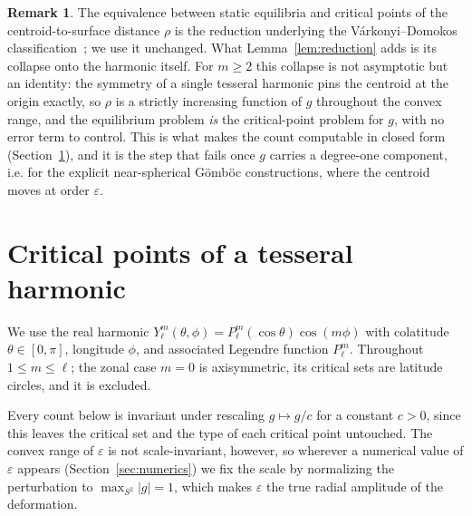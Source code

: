 \documentclass[11pt,a4paper]{article}
\theoremstyle{definition}
\newtheorem{remark}{Remark}
\begin{document}
\begin{remark}
The equivalence between static equilibria and critical points of the centroid-to-surface distance $\rho$ is
the reduction underlying the V\'arkonyi--Domokos classification~\cite{varkonyi2006b}; we use it unchanged. What
Lemma~\ref{lem:reduction} adds is its collapse onto the harmonic itself. For $m\ge2$ this collapse is not
asymptotic but an identity: the symmetry of a single tesseral harmonic pins the centroid at the origin
exactly, so $\rho$ is a strictly increasing function of $g$ throughout the convex range, and the equilibrium
problem \emph{is} the critical-point problem for $g$, with no error term to control. This is what makes the
count computable in closed form (Section~\ref{sec:count}), and it is the step that fails once $g$ carries a
degree-one component, i.e. for the explicit near-spherical G\"omb\"oc constructions, where the centroid moves
at order $\varepsilon$.
\end{remark}

\section{Critical points of a tesseral harmonic}\label{sec:count}

We use the real harmonic $Y_\ell^m(\theta,\phi)=P_\ell^m(\cos\theta)\cos(m\phi)$ with colatitude
$\theta\in[0,\pi]$, longitude $\phi$, and associated Legendre function $P_\ell^m$. Throughout $1\le m\le\ell$;
the zonal case $m=0$ is axisymmetric, its critical sets are latitude circles, and it is excluded.

Every count below is invariant under rescaling $g\mapsto g/c$ for a constant $c>0$, since this leaves the
critical set and the type of each critical point untouched. The convex range of $\varepsilon$ is not
scale-invariant, however, so wherever a numerical value of $\varepsilon$ appears (Section~\ref{sec:numerics})
we fix the scale by normalizing the perturbation to $\max_{S^2}\lvert g\rvert=1$, which makes $\varepsilon$
the true radial amplitude of the deformation.
\end{document}
